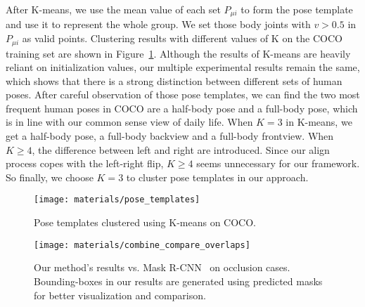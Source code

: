 \documentclass[10pt,twocolumn,letterpaper]{article}
\begin{document}
\noindent After K-means, we use the mean value of each set $P_{\mu i}$ to form the pose template and use it to represent the
whole group. We set those body joints with $v>0.5$ in $P_{\mu i}$ as valid points. Clustering results with different values of
K on the COCO training set are shown in Figure~\ref{fig:templates}. Although the results of K-means are heavily reliant on
initialization values, our multiple experimental results remain the same, which shows that there is a strong distinction between
different sets of human poses. After careful observation of those pose templates, we can find the two most frequent human poses
in COCO are a half-body pose and a full-body pose, which is in line with our common sense view of daily life. When $K=3$ in
K-means, we get a half-body pose, a full-body backview and a full-body frontview. When $K\geq 4$, the difference between left
and right are introduced. Since our align process copes with the left-right flip, $K\geq 4$ seems unnecessary for our framework. So finally, we choose $K=3$ to cluster pose templates in our approach.


\begin{figure}[t]
\centering
\texttt{[image: materials/pose\_templates]} 
\setlength{\abovecaptionskip}{-0.3cm}
\setlength{\belowcaptionskip}{-0.5cm}
\caption{Pose templates clustered using K-means on COCO.}
\label{fig:templates}
\end{figure}

\begin{figure*}[t]
\setlength{\abovecaptionskip}{0.1cm}
\setlength{\belowcaptionskip}{-0.4cm}
\centering
\texttt{[image: materials/combine\_compare\_overlaps]}
\caption{Our method's results vs. Mask R-CNN~\cite{He2017Mask} on occlusion cases. Bounding-boxes in our results are generated using predicted masks for better visualization and comparison.}
\label{fig:combine_compare_overlaps}
\end{figure*}
 
\end{document}
